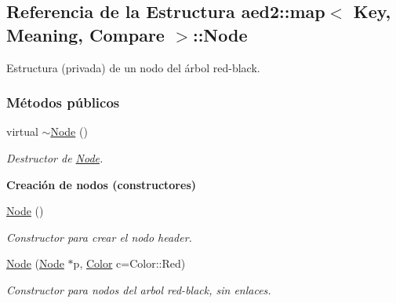 \hypertarget{structaed2_1_1map_1_1Node}{}\subsection{Referencia de la Estructura aed2\+:\+:map$<$ Key, Meaning, Compare $>$\+:\+:Node}
\label{structaed2_1_1map_1_1Node}


Estructura (privada) de un nodo del árbol red-\/black.  


\subsubsection*{Métodos públicos}
\begin{DoxyCompactItemize}
\item 
virtual \hyperlink{structaed2_1_1map_1_1Node_a4f3cb2cc4302fe96432e624ced147540_a4f3cb2cc4302fe96432e624ced147540}{$\sim$\+Node} ()
\begin{DoxyCompactList}\small\item\em Destructor de \hyperlink{structaed2_1_1map_1_1Node}{Node}. \end{DoxyCompactList}\end{DoxyCompactItemize}
\begin{Indent}\textbf{ Creación de nodos (constructores)}\par
\begin{DoxyCompactItemize}
\item 
\hyperlink{structaed2_1_1map_1_1Node_a9c1a600491066ce7eb669b1cb76d56c6_a9c1a600491066ce7eb669b1cb76d56c6}{Node} ()
\begin{DoxyCompactList}\small\item\em Constructor para crear el nodo header. \end{DoxyCompactList}\item 
\hyperlink{structaed2_1_1map_1_1Node_a62b5a42e88e219d53af8237a9ebedb6e_a62b5a42e88e219d53af8237a9ebedb6e}{Node} (\hyperlink{structaed2_1_1map_1_1Node}{Node} $\ast$p, \hyperlink{classaed2_1_1map_a6d62a415a4b9d320b30cada4ebcf9f5b_a6d62a415a4b9d320b30cada4ebcf9f5b}{Color} c=Color\+::\+Red)
\begin{DoxyCompactList}\small\item\em Constructor para nodos del arbol red-\/black, sin enlaces. \end{DoxyCompactList}\end{DoxyCompactItemize}
\end{Indent}
